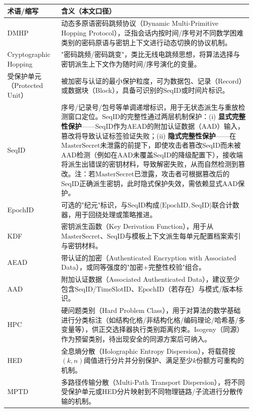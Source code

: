 ﻿\documentclass[12pt,a4paper]{article}
\begin{document}
\begin{longtable}{|>{\raggedright\arraybackslash}p{2.8cm}|>{\raggedright\arraybackslash}p{11.2cm}|}
\hline
\textbf{术语/缩写} & \textbf{含义（本文口径）} \\
\hline
\endhead
DMHP & 动态多原语密码跳频协议（Dynamic Multi-Primitive Hopping Protocol），泛指会话内按时间/序号对不同数学困难类别的密码原语与密钥上下文进行动态切换的协议机制。\\
\hline
Cryptographic Hopping & "密码跳频/密码跳变"，类比无线电跳频思想，将算法选择与密钥派生上下文作为随时间/序号演化的变量。\\
\hline
受保护单元（Protected Unit） & 被加密与认证的最小保护粒度，可为数据包、记录（Record）或数据块（Block），具备可识别的$\text{SeqID}$或时间片标识。\\
\hline
SeqID & 序号/记录号/包号等单调递增标识，用于无状态派生与重放检测窗口定位。SeqID的完整性通过两层机制保护：(i) \textbf{显式完整性保护}——SeqID作为AEAD的附加认证数据（AAD）输入，篡改将导致认证标签验证失败；(ii) \textbf{隐式完整性保护}——在$\text{MasterSecret}$未泄露的前提下，即使攻击者篡改SeqID而未被AAD检测（例如在AAD未覆盖SeqID的降级配置下），接收端将派生出错误的密钥材料，导致解密失败，从而自然检测到篡改。注：若$\text{MasterSecret}$已泄露，攻击者可根据篡改后的SeqID正确派生密钥，此时隐式保护失效，需依赖显式AAD保护。\\
\hline
EpochID & 可选的"纪元"标识，与$\text{SeqID}$构成$\langle\text{EpochID},\text{SeqID}\rangle$联合计数器，用于回绕处理或策略推进。\\
\hline
KDF & 密钥派生函数（Key Derivation Function），用于从$\text{MasterSecret}$、$\text{SeqID}$与模板上下文派生每单元配置档案索引与密钥材料。\\
\hline
AEAD & 带认证的加密（Authenticated Encryption with Associated Data），或同等强度的"加密+完整性校验"组合。\\
\hline
AAD & 附加认证数据（Associated Authenticated Data），建议至少包含$\text{SeqID}$/$\text{TimeSlotID}$、$\text{EpochID}$（若存在）与模式/版本标识。\\
\hline
HPC & 硬问题类别（Hard Problem Class），用于对算法的数学基础进行分类标注（如结构化格/非结构化格/编码理论/哈希基/多变量等），供正交选择器执行类别距离约束。Isogeny（同源）作为预留类别，待出现安全的同源方案后可纳入。\\
\hline
HED & 全息熵分散（Holographic Entropy Dispersion），将载荷按$(k,n)$阈值进行分片并分别保护、满足至少$k$份额方可重构的机制。\\
\hline
MPTD & 多路径传输分散（Multi-Path Transport Dispersion），将不同受保护单元或HED分片映射到不同物理链路/子流进行分散传输的机制。\\

\end{longtable}
\end{document}
